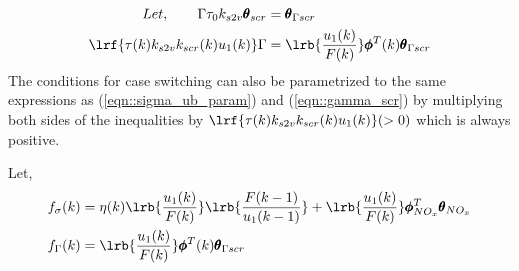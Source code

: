 \begin{align}
        Let, \qquad  \Gamma \tau_0 k_{s2v} \pmb \theta_{scr} &= \pmb \theta_{\Gamma scr}\\
        \lrf{\tau(k) k_{s2v} k_{scr}(k) u_1(k)} \Gamma  &=
        \lrb{\frac{u_1(k)}{F(k)}} \pmb \phi^T(k)  \pmb \theta_{\Gamma scr}
        \label{eqn::gamma_scr}
\end{align}
The conditions for case switching can also be parametrized to the same expressions as (\ref{eqn::sigma_ub_param}) and (\ref{eqn::gamma_scr}) by multiplying both sides of the inequalities by $\lrf{\tau(k) k_{s2v} k_{scr}(k) u_1(k)} (>0)$ which is always positive.

Let,
\begin{align}
        f_{\sigma}(k) &= \eta(k) \lrb{\frac{u_1(k)}{F(k)}} \lrb{\frac{F(k-1)}{u_1(k-1)}}
        +\lrb{\frac{u_1(k)}{F(k)}} \pmb \phi_{NO_x}^T \pmb \theta_{NO_x}\\
        f_{\Gamma}(k) &= \lrb{\frac{u_1(k)}{F(k)}} \pmb \phi^T(k)  \pmb \theta_{\Gamma scr}
\end{align}

